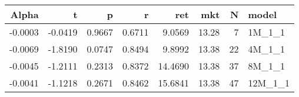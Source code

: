 \begin{table}[ht]
\centering
\begin{tabular}{rrrrrrrl}
  \hline
Alpha & t & p & r & ret & mkt & N & model \\ 
  \hline
-0.0003 & -0.0419 & 0.9667 & 0.6711 & 9.0569 & 13.28 & 7 & 1M\_1\_1 \\ 
  -0.0069 & -1.8190 & 0.0747 & 0.8494 & 9.8992 & 13.38 & 22 & 4M\_1\_1 \\ 
  -0.0045 & -1.2111 & 0.2313 & 0.8372 & 14.4690 & 13.38 & 37 & 8M\_1\_1 \\ 
  -0.0041 & -1.1218 & 0.2671 & 0.8462 & 15.6841 & 13.38 & 47 & 12M\_1\_1 \\ 
   \hline
\end{tabular}
\end{table}

